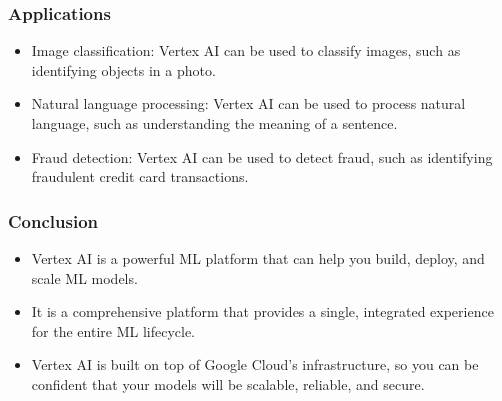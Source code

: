 \begin{frame}[fragile]\frametitle{Applications}

\begin{itemize}
\item Image classification: Vertex AI can be used to classify images, such as identifying objects in a photo.
\item Natural language processing: Vertex AI can be used to process natural language, such as understanding the meaning of a sentence.
\item Fraud detection: Vertex AI can be used to detect fraud, such as identifying fraudulent credit card transactions.
\end{itemize}
\end{frame}

\begin{frame}[fragile]\frametitle{Conclusion}

\begin{itemize}
\item Vertex AI is a powerful ML platform that can help you build, deploy, and scale ML models.
\item It is a comprehensive platform that provides a single, integrated experience for the entire ML lifecycle.
\item Vertex AI is built on top of Google Cloud's infrastructure, so you can be confident that your models will be scalable, reliable, and secure.
\end{itemize}

\end{frame}
